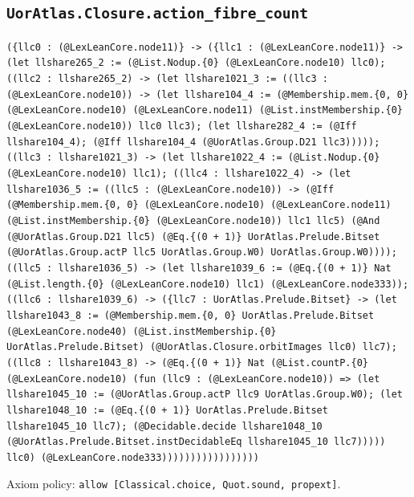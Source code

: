 \documentclass[11pt]{article}
\begin{document}
\subsection*{\texttt{UorAtlas.Closure.action\_fibre\_count}}
\noindent\texttt{(\{llc0 : (@LexLeanCore.node11)\} -> (\{llc1 : (@LexLeanCore.node11)\} -> (let llshare265\_2 := (@List.Nodup.\{0\} (@LexLeanCore.node10) llc0); ((llc2 : llshare265\_2) -> (let llshare1021\_3 := ((llc3 : (@LexLeanCore.node10)) -> (let llshare104\_4 := (@Membership.mem.\{0, 0\} (@LexLeanCore.node10) (@LexLeanCore.node11) (@List.instMembership.\{0\} (@LexLeanCore.node10)) llc0 llc3); (let llshare282\_4 := (@Iff llshare104\_4); (@Iff llshare104\_4 (@UorAtlas.Group.D21 llc3))))); ((llc3 : llshare1021\_3) -> (let llshare1022\_4 := (@List.Nodup.\{0\} (@LexLeanCore.node10) llc1); ((llc4 : llshare1022\_4) -> (let llshare1036\_5 := ((llc5 : (@LexLeanCore.node10)) -> (@Iff (@Membership.mem.\{0, 0\} (@LexLeanCore.node10) (@LexLeanCore.node11) (@List.instMembership.\{0\} (@LexLeanCore.node10)) llc1 llc5) (@And (@UorAtlas.Group.D21 llc5) (@Eq.\{(0 + 1)\} UorAtlas.Prelude.Bitset (@UorAtlas.Group.actP llc5 UorAtlas.Group.W0) UorAtlas.Group.W0)))); ((llc5 : llshare1036\_5) -> (let llshare1039\_6 := (@Eq.\{(0 + 1)\} Nat (@List.length.\{0\} (@LexLeanCore.node10) llc1) (@LexLeanCore.node333)); ((llc6 : llshare1039\_6) -> (\{llc7 : UorAtlas.Prelude.Bitset\} -> (let llshare1043\_8 := (@Membership.mem.\{0, 0\} UorAtlas.Prelude.Bitset (@LexLeanCore.node40) (@List.instMembership.\{0\} UorAtlas.Prelude.Bitset) (@UorAtlas.Closure.orbitImages llc0) llc7); ((llc8 : llshare1043\_8) -> (@Eq.\{(0 + 1)\} Nat (@List.countP.\{0\} (@LexLeanCore.node10) (fun (llc9 : (@LexLeanCore.node10)) => (let llshare1045\_10 := (@UorAtlas.Group.actP llc9 UorAtlas.Group.W0); (let llshare1048\_10 := (@Eq.\{(0 + 1)\} UorAtlas.Prelude.Bitset llshare1045\_10 llc7); (@Decidable.decide llshare1048\_10 (@UorAtlas.Prelude.Bitset.instDecidableEq llshare1045\_10 llc7))))) llc0) (@LexLeanCore.node333)))))))))))))))))}\par
\noindent Axiom policy: \texttt{allow [Classical.choice, Quot.sound, propext]}.\par
\end{document}
